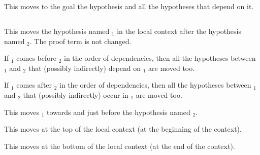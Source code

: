 \begin{Variants}
\item {}

 This moves to the goal the hypothesis {\ident} and all the hypotheses
 that depend on it.

\end{Variants}

\subsection{}
\label{move}

This moves the hypothesis named {\ident$_1$} in the local context
after the hypothesis named {\ident$_2$}. The proof term is not changed.

If {\ident$_1$} comes before {\ident$_2$} in the order of dependencies,
then all the hypotheses between {\ident$_1$} and {\ident$_2$} that
(possibly indirectly) depend on {\ident$_1$} are moved too.

If {\ident$_1$} comes after {\ident$_2$} in the order of dependencies,
then all the hypotheses between {\ident$_1$} and {\ident$_2$} that
(possibly indirectly) occur in {\ident$_1$} are moved too.

\begin{Variants}

\item {}

This moves {\ident$_1$} towards and just before the hypothesis named {\ident$_2$}.

\item {}

This moves {\ident} at the top of the local context (at the beginning of the context).

\item {}

This moves {\ident} at the bottom of the local context (at the end of the context).

\end{Variants}

\begin{ErrMsgs}

\item {}

\item {}

\item {}

\end{ErrMsgs}

